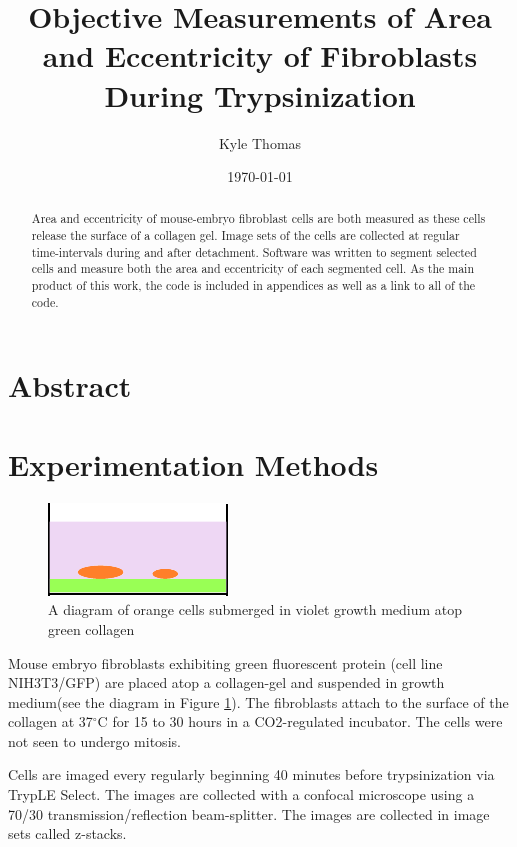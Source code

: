 \documentclass[ twocolumn,notitlepage]{ revtex4-1}
\begin{document}
\title{Objective Measurements of Area and Eccentricity of Fibroblasts During Trypsinization}
\author{Kyle Thomas}
\date{\today}
\maketitle

\onecolumngrid
\section*{Abstract}
\begin{abstract}
\begin{center}
Area and eccentricity of mouse-embryo fibroblast cells are both measured as these cells release the surface of a collagen gel. Image sets of the cells are collected at regular time-intervals during and after detachment. Software was written to segment selected cells and measure both the area and eccentricity of each segmented cell. As the main product of this work, the code is included in appendices as well as a link to all of the code.
\end{center}
\end{abstract}
\twocolumngrid

\section*{Experimentation Methods}
\begin{figure}
  \centering
  \caption{\label{fig:cellDiagram}A diagram of orange cells submerged in violet growth medium atop green collagen}
  \includegraphics[clip=true,width=.4\textwidth]{img/cells-diagram}
\end{figure}

Mouse embryo fibroblasts exhibiting green fluorescent protein (cell line NIH3T3/GFP) are placed atop a collagen-gel and suspended in growth medium(see the diagram in Figure \ref{fig:cellDiagram}). The fibroblasts attach to the surface of the collagen at 37$^\circ$C for 15 to 30 hours in a CO2-regulated incubator. The cells were not seen to undergo mitosis.

Cells are imaged every regularly beginning 40 minutes before trypsinization via TrypLE Select. The images are collected with a confocal microscope using a 70/30 transmission/reflection beam-splitter. The images are collected in image sets called z-stacks.
\end{document}
